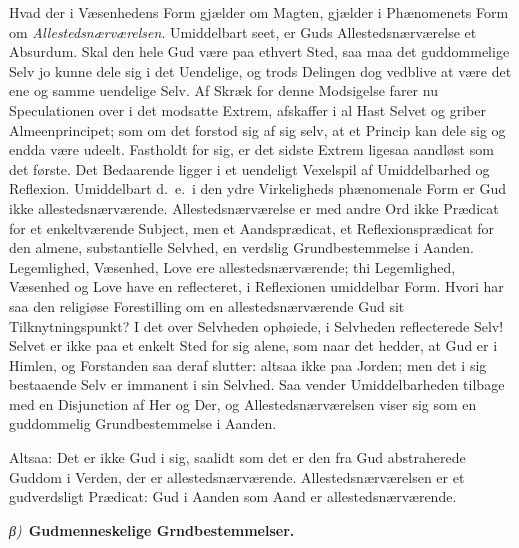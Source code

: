 \documentclass[12pt]{book}
\newcommand{\greekrun}[2]{%
  \medskip\begin{center}{\itshape #1)}\ {\bfseries #2}\end{center}\medskip}
\begin{document}
Hvad der i Væsenhedens Form gjælder om Magten,
gjælder i Phænomenets Form om \emph{Allestedsnærværelsen}.
Umiddelbart seet, er Guds Allestedsnærværelse et Absurdum. Skal den
hele Gud være paa ethvert Sted, saa maa det guddommelige Selv jo
kunne dele sig i det Uendelige, og trods Delingen dog vedblive at
være det ene og samme uendelige Selv. Af Skræk for denne Modsigelse
farer nu Speculationen over i det modsatte Extrem, afskaffer i al
Hast Selvet og griber Almeenprincipet; som om det forstod sig af sig
selv, at et Princip kan dele sig og endda være udeelt. Fastholdt for
sig, er det sidste Extrem ligesaa aandløst som det første. Det
Bedaarende ligger i et uendeligt Vexelspil af Umiddelbarhed og
Reflexion. Umiddelbart d.\ e.\ i den ydre Virkeligheds phænomenale
Form er Gud ikke allestedsnærværende. Allestedsnærværelse er med
andre Ord ikke Prædicat for et enkeltværende Subject, men et
Aandsprædicat, et Reflexionsprædicat for den almene, substantielle
Selvhed, en verdslig Grundbestemmelse i Aanden. Legemlighed,
Væsenhed, Love ere allestedsnærværende; thi Legemlighed, Væsenhed og
Love have en reflecteret, i Reflexionen umiddelbar Form. Hvori har
saa den religiøse Forestilling om en allestedsnærværende Gud sit
Tilknytningspunkt? I det over Selvheden ophøiede, i Selvheden
reflecterede Selv! Selvet er ikke paa et enkelt Sted for sig alene,
som naar det hedder, at Gud er i Himlen, og Forstanden saa deraf
slutter: altsaa ikke paa Jorden; men det i sig bestaaende Selv er
immanent i sin Selvhed. Saa vender Umiddelbarheden tilbage med en
Disjunction af Her og Der, og Allestedsnærværelsen viser sig som en
guddommelig Grundbestemmelse i Aanden.

Altsaa: Det er ikke Gud i sig, saalidt som det er den fra Gud
abstraherede Guddom i Verden, der er allestedsnærværende.
Allestedsnærværelsen er et gudverdsligt Prædicat: Gud i Aanden som
Aand er allestedsnærværende.

\greekrun{β}{Gudmenneskelige Grndbestemmelser.}
\end{document}
